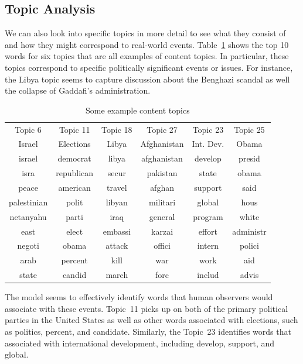 \documentclass[12pt]{article}
\theoremstyle{definition}
\theoremstyle{algodesc}
\begin{document}
\subsection{Topic Analysis}
We can also look into specific topics in more detail to see what they consist of and how they might correspond to real-world events. Table~\ref{tab:content_topics} shows the top 10 words for six topics that are all examples of content topics. In particular, these topics correspond to specific politically significant events or issues. For instance, the Libya topic seems to capture discussion about the Benghazi scandal as well the collapse of Gaddafi's administration.

\begin{table}[h] \centering
\begin{tabular}{cccccc}
  \toprule
  Topic 6     & Topic 11   & Topic 18 & Topic 27    & Topic 23  & Topic 25 \\
  Israel      & Elections  & Libya    & Afghanistan & Int. Dev. & Obama \\
  \midrule
  israel      & democrat   & libya    & afghanistan & develop   & presid \\
  isra        & republican & secur    & pakistan    & state     & obama \\
  peace       & american   & travel   & afghan      & support   & said \\
  palestinian & polit      & libyan   & militari    & global    & hous \\
  netanyahu   & parti      & iraq     & general     & program   & white \\
  east        & elect      & embassi  & karzai      & effort    & administr \\
  negoti      & obama      & attack   & offici      & intern    & polici \\
  arab        & percent    & kill     & war         & work      & aid \\
  state       & candid     & march    & forc        & includ    & advis \\
  \bottomrule
\end{tabular}
\caption{Some example content topics}
\label{tab:content_topics}
\end{table}

The model seems to effectively identify words that human observers would associate with these events. Topic~11 picks up on both of the primary political parties in the United States as well as other words associated with elections, such as politics, percent, and candidate. Similarly, the Topic~23 identifies words that associated with international development, including develop, support, and global.
\end{document}
